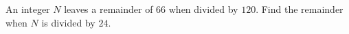 An integer $N$ leaves a remainder of 66 when divided by $120$. Find the remainder when $N$ is divided by $24$.
